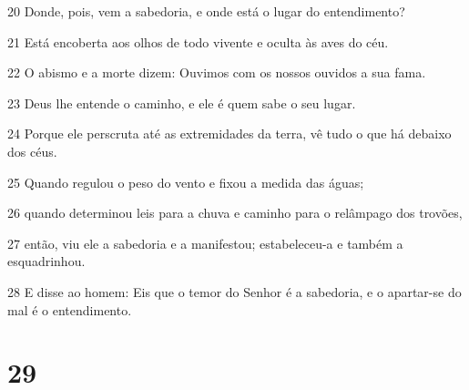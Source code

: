 \par 20 Donde, pois, vem a sabedoria, e onde está o lugar do entendimento?
\par 21 Está encoberta aos olhos de todo vivente e oculta às aves do céu.
\par 22 O abismo e a morte dizem: Ouvimos com os nossos ouvidos a sua fama.
\par 23 Deus lhe entende o caminho, e ele é quem sabe o seu lugar.
\par 24 Porque ele perscruta até as extremidades da terra, vê tudo o que há debaixo dos céus.
\par 25 Quando regulou o peso do vento e fixou a medida das águas;
\par 26 quando determinou leis para a chuva e caminho para o relâmpago dos trovões,
\par 27 então, viu ele a sabedoria e a manifestou; estabeleceu-a e também a esquadrinhou.
\par 28 E disse ao homem: Eis que o temor do Senhor é a sabedoria, e o apartar-se do mal é o entendimento.

\chapter{29}

